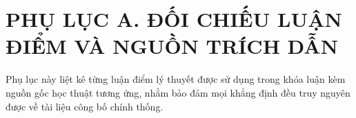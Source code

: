 %      

\chapter*{PHỤ LỤC A. ĐỐI CHIẾU LUẬN ĐIỂM VÀ NGUỒN TRÍCH DẪN}
\label{app:nguon}

Phụ lục này liệt kê từng luận điểm lý thuyết được sử dụng trong khóa luận kèm
nguồn gốc học thuật tương ứng, nhằm bảo đảm mọi khẳng định đều truy nguyên được
về tài liệu công bố chính thống.

